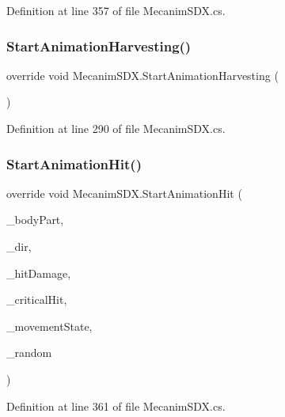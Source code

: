 Definition at line 357 of file Mecanim\+S\+D\+X.\+cs.

\mbox{\label{class_mecanim_s_d_x_accb9a9db5430753e8129f98d10e3e547}} 
\subsubsection{\texorpdfstring{StartAnimationHarvesting()}{StartAnimationHarvesting()}}
{\footnotesize\ttfamily override void Mecanim\+S\+D\+X.\+Start\+Animation\+Harvesting (\begin{DoxyParamCaption}{ }\end{DoxyParamCaption})}



Definition at line 290 of file Mecanim\+S\+D\+X.\+cs.

\mbox{\label{class_mecanim_s_d_x_ae3b64d7b8703ed699a8db437c61d5033}} 
\subsubsection{\texorpdfstring{StartAnimationHit()}{StartAnimationHit()}}
{\footnotesize\ttfamily override void Mecanim\+S\+D\+X.\+Start\+Animation\+Hit (\begin{DoxyParamCaption}\item[{Enum\+Body\+Part\+Hit}]{\+\_\+body\+Part,  }\item[{int}]{\+\_\+dir,  }\item[{int}]{\+\_\+hit\+Damage,  }\item[{bool}]{\+\_\+critical\+Hit,  }\item[{int}]{\+\_\+movement\+State,  }\item[{float}]{\+\_\+random }\end{DoxyParamCaption})}



Definition at line 361 of file Mecanim\+S\+D\+X.\+cs.

\mbox{\label{class_mecanim_s_d_x_aee9c866fd451db510e03b08ad3cb1275}} 
